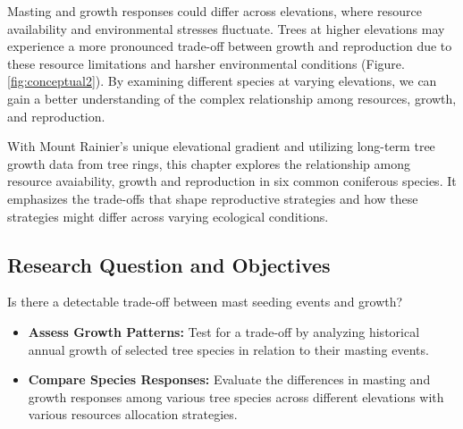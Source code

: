 \documentclass[11pt,letter]{article}
\begin{document}
Masting and growth responses could differ across elevations, where resource availability and environmental stresses fluctuate. Trees at higher elevations may experience a more pronounced trade-off between growth and reproduction due to these resource limitations and harsher environmental conditions (Figure. \ref{fig:conceptual2}). By examining different species at varying elevations, we can gain a better understanding of the complex relationship among resources, growth, and reproduction.\par
With Mount Rainier's unique elevational gradient and utilizing long-term tree growth data from tree rings, this chapter explores the relationship among resource avaiability, growth and reproduction in six common coniferous species. It emphasizes the trade-offs that shape reproductive strategies and how these strategies might differ across varying ecological conditions.
\subsection{Research Question and Objectives}
Is there a detectable trade-off between mast seeding events and growth?
	\begin{itemize}
	\item \textbf{Assess Growth Patterns:} Test for a trade-off by analyzing historical annual growth of selected tree species in relation to their masting events.
	\item \textbf{Compare Species Responses:} Evaluate the differences in masting and growth responses among various tree species across different elevations with various resources allocation strategies.
	\end{itemize}
\end{document}
